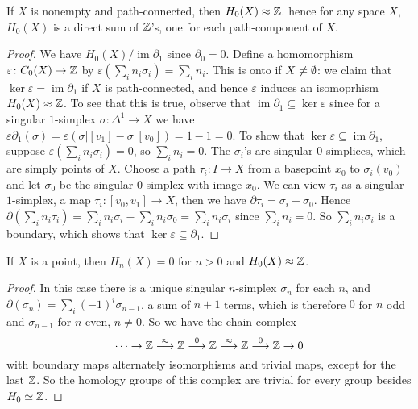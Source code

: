 \begin{prop}
    If $X$ is nonempty and path-connected, then $H_0(X)\approx  \mathbb{Z}$. hence for any space $X$, $H_0(X)$ is a direct sum of $\mathbb{Z}$'s, one for each path-component of $X$.
\end{prop}
\begin{proof}
    We have $H_0(X) / \operatorname{im}\partial_1 $ since $\partial_0=0 $. Define a homomorphism $\varepsilon \colon C_0(X) \to \mathbb{Z}$ by $\varepsilon \left( \sum_{i}^{} n_i \sigma_i  \right) =\sum_{i}^{} n_i . $ This is onto if $X\neq \emptyset$: we claim that $\ker \varepsilon =\operatorname{im}\partial_1 $ if $X$ is path-connected, and hence $ \varepsilon$ induces an isomoprhism $H_0(X)\approx \mathbb{Z}$. To see that this is true, observe that $\operatorname{im}\partial_1\subseteq \ker \varepsilon  $ since for a singular $1$-simplex $\sigma \colon \Delta ^1 \to X$ we have $\varepsilon \partial_1 (\sigma)=\varepsilon \left( \left. \sigma \right| [v_1]- \left. \sigma \right| [v_0] \right) =1-1=0$. To show that $\ker \varepsilon \subseteq \operatorname{im}\partial_1 $, suppose $\varepsilon \left( \sum_{i}^{} n_i \sigma_i \right)=0 $, so $\sum_{i}^{} n_i =0. $ The $\sigma_i $'s are singular $0 $-simplices, which are simply points of $X$. Choose a path $\tau_i \colon I \to X$ from a basepoint $x_0$ to $ \sigma_i (v_0)$ and let $\sigma_0$ be the singular $0$-simplex with image $x_0$. We can view $\tau_i $ as a singular $1 $-simplex, a map $\tau_i \colon [v_0,v_1] \to X$, then we have $\partial \tau_i =\sigma_i -\sigma_0$. Hence $\partial \left( \sum_{i}^{} n_i \tau_i  \right) =\sum_{i}^{} n_i \sigma_i -\sum_{i}^{} n_i \sigma_0=\sum_{i}^{} n_i \sigma_i $ since $\sum_{i}^{} n_i =0.$ So $\sum_{i}^{}n_i \sigma_i $ is a boundary, which shows that $\ker \varepsilon \subseteq \partial_1 $.
\end{proof}
\begin{prop}\label{point}
    If $X$ is a point, then $H_n (X)=0$ for $n>0$ and $H_0(X)\approx \mathbb{Z}$.
\end{prop}
\begin{proof}
    In this case there is a unique singular $n$-simplex $\sigma_n $ for each $n$, and $\partial (\sigma_n )=\sum_{i}^{} (-1)^i \sigma_{n-1}$, a sum of $n+1$ terms, which is therefore $0$ for $n$ odd and $\sigma_{n-1}$ for $n$ even, $n\neq 0$. So we have the chain complex \[
    \cdots \to \mathbb{Z} \overset{\approx}{\longrightarrow}\mathbb{Z} \overset{0}{\longrightarrow} \mathbb{Z} \overset{\approx}{\longrightarrow} \mathbb{Z} \overset{0}{\longrightarrow} \mathbb{Z}\to0
    \] with boundary maps alternately isomorphisms and trivial maps, except for the last $\mathbb{Z}$. So the homology groups of this complex are trivial for every group besides $H_0\simeq\mathbb{Z}$.
\end{proof}
